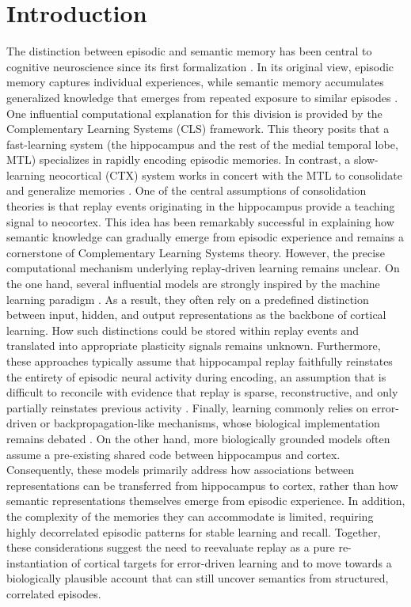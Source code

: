 \documentclass{article}
\begin{document}
\section*{Introduction}
The distinction between episodic and semantic memory has been central to cognitive neuroscience since its first formalization . In its original view, episodic memory captures individual experiences, while semantic memory accumulates generalized knowledge that emerges from repeated exposure to similar episodes . One influential computational explanation for this division is provided by the Complementary Learning Systems (CLS) framework. This theory posits that a fast-learning system (the hippocampus and the rest of the medial temporal lobe, MTL) specializes in rapidly encoding episodic memories. In contrast, a slow-learning neocortical (CTX) system works in concert with the MTL to consolidate and generalize memories .
\newline\newline
One of the central assumptions of consolidation theories is that replay events originating in the hippocampus provide a teaching signal to neocortex. This idea has been remarkably successful in explaining how semantic knowledge can gradually emerge from episodic experience and remains a cornerstone of Complementary Learning Systems theory. However, the precise computational mechanism underlying replay-driven learning remains unclear. On the one hand, several influential models are strongly inspired by the machine learning paradigm . As a result, they often rely on a predefined distinction between input, hidden, and output representations as the backbone of cortical learning. How such distinctions could be stored within replay events and translated into appropriate plasticity signals remains unknown. Furthermore, these approaches typically assume that hippocampal replay faithfully reinstates the entirety of episodic neural activity during encoding, an assumption that is difficult to reconcile with evidence that replay is sparse, reconstructive, and only partially reinstates previous activity . Finally, learning commonly relies on error-driven or backpropagation-like mechanisms, whose biological implementation remains debated . On the other hand, more biologically grounded models  often assume a pre-existing shared code between hippocampus and cortex. Consequently, these models primarily address how associations between representations can be transferred from hippocampus to cortex, rather than how semantic representations themselves emerge from episodic experience. In addition, the complexity of the memories they can accommodate is limited, requiring highly decorrelated episodic patterns for stable learning and recall. Together, these considerations suggest the need to reevaluate replay as a pure re-instantiation of cortical targets for error-driven learning and to move towards a biologically plausible account that can still uncover semantics from structured, correlated episodes.
\end{document}
